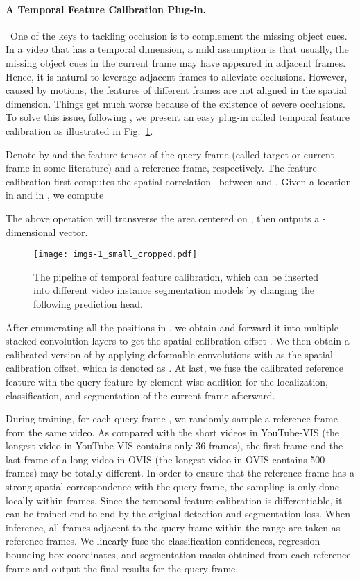 \documentclass[twocolumn]{svjour3}          \smartqed  \usepackage{graphicx}
\begin{document}
\begin{sloppypar}
\paragraph{A Temporal Feature Calibration Plug-in.}~One of the keys to tackling occlusion is to complement the missing object cues. In a video that has a temporal dimension, a mild assumption is that usually, the missing object cues in the current frame may have appeared in adjacent frames. Hence, it is natural to leverage adjacent frames to alleviate occlusions. However, caused by motions, the features of different frames are not aligned in the spatial dimension. Things get much worse because of the existence of severe occlusions. To solve this issue, following \cite{spatiotemporal_sampling,flownet}, we present an easy plug-in called temporal feature calibration as illustrated in Fig.~\ref{fig:overall_architecture}.

Denote by  and  the feature tensor of the query frame (called target or current frame in some literature) and a reference frame, respectively. The feature calibration first computes the spatial correlation~\cite{flownet} between  and . Given a location  in  and  in , we compute 

The above operation will transverse the  area centered on , then outputs a -dimensional vector.

\begin{figure}[!t]
\centering
\texttt{[image: imgs-1\_small\_cropped.pdf]}
\caption{The pipeline of temporal feature calibration, which can be inserted into different video instance segmentation models by changing the following prediction head.}
\label{fig:overall_architecture}
\end{figure}

After enumerating all the positions in , we obtain  and forward it into multiple stacked convolution layers to get the spatial calibration offset . We then obtain a calibrated version of  by applying deformable convolutions with  as the spatial calibration offset, which is denoted as . At last, we fuse the calibrated reference feature  with the query feature  by element-wise addition for the localization, classification, and segmentation of the current frame afterward.

During training, for each query frame , we randomly sample a reference frame  from the same video. As compared with the short videos in YouTube-VIS (the longest video in YouTube-VIS contains only 36 frames), the first frame and the last frame of a long video in OVIS (the longest video in OVIS contains 500 frames) may be totally different. In order to ensure that the reference frame has a strong spatial correspondence with the query frame, the sampling is only done locally within  frames. Since the temporal feature calibration is differentiable, it can be trained end-to-end by the original detection and segmentation loss. When inference, all frames adjacent to the query frame within the range  are taken as reference frames. We linearly fuse the classification confidences, regression bounding box coordinates, and segmentation masks obtained from each reference frame and output the final results for the query frame.


\end{sloppypar}
\end{document}

